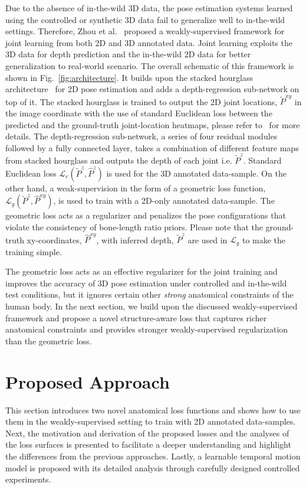 \documentclass[runningheads]{llncs}
\begin{document}
Due to the absence of in-the-wild 3D data, the pose estimation systems learned using the controlled or synthetic 3D data fail to generalize well to in-the-wild settings. Therefore, Zhou et al.~\cite{Zhou_2017_ICCV} proposed a weakly-supervised framework for joint learning from both 2D and 3D annotated data. Joint learning exploits the 3D data for depth prediction and the in-the-wild 2D data for better generalization to real-world scenario. The overall schematic of this framework is shown in Fig.~\ref{fig:architecture}. It builds upon the stacked hourglass architecture~\cite{NewellYD16} for 2D pose estimation and adds a depth-regression sub-network on top of it. The stacked hourglass is trained to output the 2D joint locations, $\tilde{P}^{xy}$ in the image coordinate with the use of standard Euclidean loss between the predicted and the ground-truth joint-location heatmaps, please refer to~\cite{NewellYD16} for more details. The depth-regression sub-network, a series of four residual modules~\cite{he2016deep} followed by a fully connected layer, takes a combination of different feature maps from stacked hourglass and outputs the depth of each joint i.e. $\tilde{P}^z$. Standard Euclidean loss $\mathcal{L}_{e}(\tilde{P}^z, \hat{P}^z)$ is used for the 3D annotated data-sample. On the other hand, a weak-supervision in the form of a geometric loss function, $\mathcal{L}_{g}(\tilde{P}^{z}, \hat{P}^{xy})$, is used to train with a 2D-only annotated data-sample. The geometric loss acts as a regularizer and penalizes the pose configurations that violate the consistency of bone-length ratio priors. Please note that the ground-truth xy-coordinates, $\hat{P}^{xy}$, with inferred depth, $\tilde{P}^z$ are used in $\mathcal{L}_g$ to make the training simple.

The geometric loss acts as an effective regularizer for the joint training and improves the accuracy of 3D pose estimation under controlled and in-the-wild test conditions, but it ignores certain other \emph{strong} anatomical constraints of the human body. In the next section, we build upon the discussed weakly-supervised framework and propose a novel structure-aware loss that captures richer anatomical constraints and provides stronger weakly-supervised regularization than the geometric loss. 

\section{Proposed Approach}
This section introduces two novel anatomical loss functions and shows how to use them in the weakly-supervised setting to train with 2D annotated data-samples. Next, the motivation and derivation of the proposed losses and the analyses of the loss surfaces is presented to facilitate a deeper understanding and highlight the differences from the previous approaches. Lastly, a learnable temporal motion model is proposed with its detailed analysis through carefully designed controlled experiments.
\end{document}
